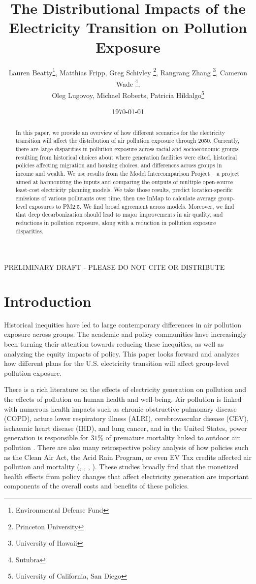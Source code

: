 \documentclass[a4paper]{article}
\title{The Distributional Impacts of the Electricity Transition on Pollution Exposure}
\author{Lauren Beatty\thanks{Environmental Defense Fund}, 
Matthias Fripp\footnotemark[1], 
Greg Schivley \thanks{Princeton University}, 
Rangrang Zhang \thanks{University of Hawaii}, 
Cameron Wade \thanks{Sutubra}, \\ 
Oleg Lugovoy, 
Michael Roberts\footnotemark[3], 
Patricia Hildalgo\thanks{University of California, San Diego}}
\date{\today}
\theoremstyle{definition}
\theoremstyle{plain}
\begin{document}
\maketitle
\begin{center}
    PRELIMINARY DRAFT - PLEASE DO NOT CITE OR DISTRIBUTE
\end{center}

\begin{abstract}
    In this paper, we provide an overview of how different scenarios for the electricity transition will affect the distribution of air pollution exposure through 2050.  Currently, there are large disparities in pollution exposure across racial and socioeconomic groups resulting from historical choices about where generation facilities were cited, historical policies affecting migration and housing choices, and differences across groups in income and wealth. We use results from the Model Intercomparison Project -- a project aimed at harmonizing the inputs and comparing the outputs of multiple open-source least-cost electricity planning models.  We take those results, predict location-specific emissions of various pollutants over time, then use InMap to calculate average group-level exposures to PM2.5.  We find broad agreement across models.  Moreover, we find that deep decarbonization should lead to major improvements in air quality, and reductions in pollution exposure, along with a reduction in pollution exposure disparities.
\end{abstract}

\newpage
\section{Introduction}
Historical inequities have led to large contemporary differences in air pollution exposure across groups.  The academic and policy communities have increasingly been turning their attention towards reducing these inequities, as well as analyzing the equity impacts of policy.  This paper looks forward and analyzes how different plans for the U.S. electricity transition will affect group-level pollution exposure. 


There is a rich literature on the effects of electricity generation on pollution and the effects of pollution on human health and well-being. Air pollution is linked with numerous health impacts such as chronic obstructive pulmonary disease (COPD), acture lower respiratory illness (ALRI), cerebrovascular disease (CEV), ischaemic heart disease (IHD), and lung cancer, and in the United States, power generation is responsible for $31\%$ of premature mortality linked to outdoor air pollution \citep{Lelieveld2015TheScale}.  There are also many retrospective policy analysis of how policies such as the Clean Air Act, the Acid Rain Program, or even EV Tax credits affected air pollution and mortality (\citet{Cropper2023The1970s}, \citet{Chay2003TheJSTOR}, \citet{Holland2019DistributionalAdoption}, \citet{Chan2018}).  These studies broadly find that the monetized health effects from policy changes that affect electricity generation are important components of the overall costs and benefits of these policies.
\end{document}

